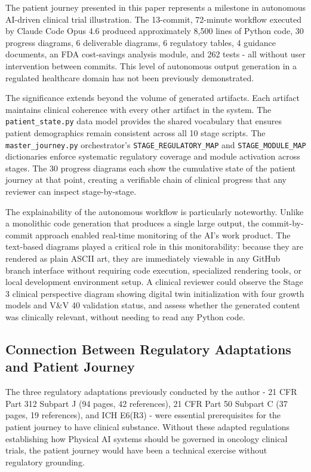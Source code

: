 \documentclass{article}
\begin{document}
The patient journey presented in this paper represents a milestone in autonomous AI-driven clinical trial illustration. The 13-commit, 72-minute workflow executed by Claude Code Opus 4.6 produced approximately 8,500 lines of Python code, 30 progress diagrams, 6 deliverable diagrams, 6 regulatory tables, 4 guidance documents, an FDA cost-savings analysis module, and 262 tests - all without user intervention between commits. This level of autonomous output generation in a regulated healthcare domain has not been previously demonstrated.

The significance extends beyond the volume of generated artifacts. Each artifact maintains clinical coherence with every other artifact in the system. The \texttt{patient\_state.py} data model provides the shared vocabulary that ensures patient demographics remain consistent across all 10 stage scripts. The \texttt{master\_journey.py} orchestrator's \texttt{STAGE\_REGULATORY\_MAP} and \texttt{STAGE\_MODULE\_MAP} dictionaries enforce systematic regulatory coverage and module activation across stages. The 30 progress diagrams each show the cumulative state of the patient journey at that point, creating a verifiable chain of clinical progress that any reviewer can inspect stage-by-stage.

The explainability of the autonomous workflow is particularly noteworthy. Unlike a monolithic code generation that produces a single large output, the commit-by-commit approach enabled real-time monitoring of the AI's work product. The text-based diagrams played a critical role in this monitorability: because they are rendered as plain ASCII art, they are immediately viewable in any GitHub branch interface without requiring code execution, specialized rendering tools, or local development environment setup. A clinical reviewer could observe the Stage 3 clinical perspective diagram showing digital twin initialization with four growth models and V\&V 40 validation status, and assess whether the generated content was clinically relevant, without needing to read any Python code.

\subsection{Connection Between Regulatory Adaptations and Patient Journey}

The three regulatory adaptations previously conducted by the author - 21 CFR Part 312 Subpart J (94 pages, 42 references), 21 CFR Part 50 Subpart C (37 pages, 19 references), and ICH E6(R3) - were essential prerequisites for the patient journey to have clinical substance. Without these adapted regulations establishing how Physical AI systems should be governed in oncology clinical trials, the patient journey would have been a technical exercise without regulatory grounding.
\end{document}
